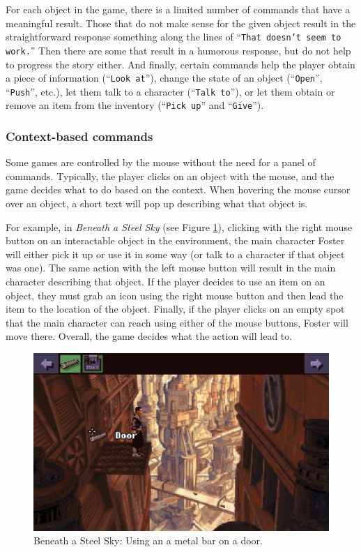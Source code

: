 For each object in the game, there is a limited number of commands that have a meaningful result. Those that do not make sense for the given object result in the straightforward response something along the lines of “\texttt{That doesn't seem to work.}”  Then there are some that result in a humorous response, but do not help to progress the story either. And finally, certain commands help the player obtain a piece of information (“\texttt{Look at}”), change the state of an object (“\texttt{Open}”, “\texttt{Push}”, etc.), let them talk to a character (“\texttt{Talk to}”), or let them obtain or remove an item from the inventory (“\texttt{Pick up}” and “\texttt{Give}”).

\subsubsection{Context-based commands}
Some games are controlled by the mouse without the need for a panel of commands. Typically, the player clicks on an object with the mouse, and the game decides what to do based on the context. When hovering the mouse cursor over an object, a short text will pop up describing what that object is.

For example, in \textit{Beneath a Steel Sky} (see Figure \ref{fig:C-BaSS}), clicking with the right mouse button on an interactable object in the environment, the main character Foster will either pick it up or use it in some way (or talk to a character if that object was one). The same action with the left mouse button will result in the main character describing that object. If the player decides to use an item on an object, they must grab an icon using the right mouse button and then lead the item to the location of the object. Finally, if the player clicks on an empty spot that the main character can reach using either of the mouse buttons, Foster will move there. Overall, the game decides what the action will lead to.

\begin{figure}[H]
\centering
\includegraphics[width=.75\linewidth]{img/C-BaSS.png}
\caption{Beneath a Steel Sky: Using an a metal bar on a door.}
\label{fig:C-BaSS}
\end{figure}

